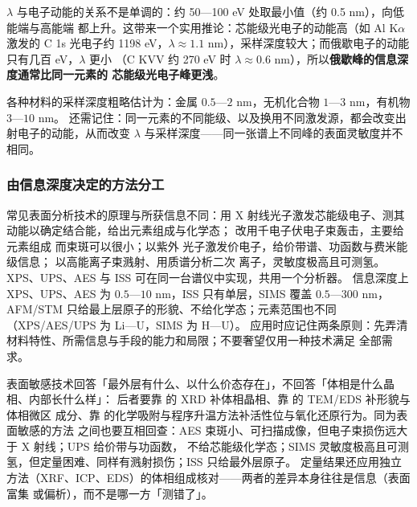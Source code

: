 $\lambda$ 与电子动能的关系不是单调的：约 50—100 eV 处取最小值（约 0.5 nm），向低能端与高能端
都上升。这带来一个实用推论：芯能级光电子的动能高（如 Al K$\alpha$ 激发的 C 1s 光电子约
1198 eV，$\lambda\approx1.1$ nm），采样深度较大；而俄歇电子的动能只有几百 eV，$\lambda$ 更小
（C KVV 约 270 eV 时 $\lambda\approx0.6$ nm），所以\textbf{俄歇峰的信息深度通常比同一元素的
芯能级光电子峰更浅}。

各种材料的采样深度粗略估计为：金属 $0.5$—$2$ nm，无机化合物 $1$—$3$ nm，有机物 $3$—$10$ nm。
还需记住：同一元素的不同能级、以及换用不同激发源，都会改变出射电子的动能，从而改变 $\lambda$
与采样深度——同一张谱上不同峰的表面灵敏度并不相同。

\subsubsection{由信息深度决定的方法分工}

常见表面分析技术的原理与所获信息不同：用 X 射线光子激发芯能级电子、测其动能以确定结合能，给出元素组成与化学态；
改用千电子伏电子束轰击，主要给元素组成
而束斑可以很小；以紫外
光子激发价电子，给价带谱、功函数与费米能级信息；%
以高能离子束溅射、用质谱分析二次
离子，灵敏度极高且可测氢。XPS、UPS、AES 与 ISS 可在同一台谱仪中实现，共用一个分析器。
信息深度上 XPS、UPS、AES 为 $0.5$—$10$ nm，ISS 只有单层，SIMS 覆盖 $0.5$—$300$ nm，
AFM/STM 只给最上层原子的形貌、不给化学态；元素范围也不同（XPS/AES/UPS 为 Li—U，SIMS 为 H—U）。
应用时应记住两条原则：先弄清材料特性、所需信息与手段的能力和局限；不要奢望仅用一种技术满足
全部需求。

\begin{crosscheck}
表面敏感技术回答「最外层有什么、以什么价态存在」，不回答「体相是什么晶相、内部长什么样」：
后者要靠  的 XRD 补体相晶相、靠  的 TEM/EDS 补形貌与体相微区
成分、靠  的化学吸附与程序升温方法补活性位与氧化还原行为。同为表面敏感的方法
之间也要互相回查：AES 束斑小、可扫描成像，但电子束损伤远大于 X 射线；UPS 给价带与功函数，
不给芯能级化学态；SIMS 灵敏度极高且可测氢，但定量困难、同样有溅射损伤；ISS 只给最外层原子。
定量结果还应用独立方法（XRF、ICP、EDS）的体相组成核对——两者的差异本身往往是信息（表面富集
或偏析），而不是哪一方「测错了」。
\end{crosscheck}

